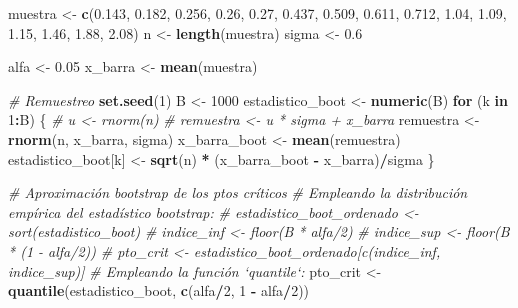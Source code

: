 \documentclass[
]{book}
\newenvironment{Shaded}{\begin{snugshade}}{\end{snugshade}}
\newcommand{\CommentTok}[1]{\textcolor[rgb]{0.56,0.35,0.01}{\textit{#1}}}
\newcommand{\ControlFlowTok}[1]{\textcolor[rgb]{0.13,0.29,0.53}{\textbf{#1}}}
\newcommand{\DecValTok}[1]{\textcolor[rgb]{0.00,0.00,0.81}{#1}}
\newcommand{\FloatTok}[1]{\textcolor[rgb]{0.00,0.00,0.81}{#1}}
\newcommand{\KeywordTok}[1]{\textcolor[rgb]{0.13,0.29,0.53}{\textbf{#1}}}
\newcommand{\NormalTok}[1]{#1}
\newcommand{\OperatorTok}[1]{\textcolor[rgb]{0.81,0.36,0.00}{\textbf{#1}}}
\newcommand{\StringTok}[1]{\textcolor[rgb]{0.31,0.60,0.02}{#1}}
\theoremstyle{definition}
\theoremstyle{definition}
\theoremstyle{definition}
\theoremstyle{remark}
\begin{document}
\begin{Shaded}
\begin{Highlighting}[]
\NormalTok{muestra <-}\StringTok{ }\KeywordTok{c}\NormalTok{(}\FloatTok{0.143}\NormalTok{, }\FloatTok{0.182}\NormalTok{, }\FloatTok{0.256}\NormalTok{, }\FloatTok{0.26}\NormalTok{, }\FloatTok{0.27}\NormalTok{, }\FloatTok{0.437}\NormalTok{, }\FloatTok{0.509}\NormalTok{, }
             \FloatTok{0.611}\NormalTok{, }\FloatTok{0.712}\NormalTok{, }\FloatTok{1.04}\NormalTok{, }\FloatTok{1.09}\NormalTok{, }\FloatTok{1.15}\NormalTok{, }\FloatTok{1.46}\NormalTok{, }\FloatTok{1.88}\NormalTok{, }\FloatTok{2.08}\NormalTok{)}
\NormalTok{n <-}\StringTok{ }\KeywordTok{length}\NormalTok{(muestra)}
\NormalTok{sigma <-}\StringTok{ }\FloatTok{0.6}

\NormalTok{alfa <-}\StringTok{ }\FloatTok{0.05}
\NormalTok{x_barra <-}\StringTok{ }\KeywordTok{mean}\NormalTok{(muestra)}

\CommentTok{# Remuestreo}
\KeywordTok{set.seed}\NormalTok{(}\DecValTok{1}\NormalTok{)}
\NormalTok{B <-}\StringTok{ }\DecValTok{1000}
\NormalTok{estadistico_boot <-}\StringTok{ }\KeywordTok{numeric}\NormalTok{(B)}
\ControlFlowTok{for}\NormalTok{ (k }\ControlFlowTok{in} \DecValTok{1}\OperatorTok{:}\NormalTok{B) \{}
    \CommentTok{# u <- rnorm(n)}
    \CommentTok{# remuestra <- u * sigma + x_barra}
\NormalTok{    remuestra <-}\StringTok{ }\KeywordTok{rnorm}\NormalTok{(n, x_barra, sigma)}
\NormalTok{    x_barra_boot <-}\StringTok{ }\KeywordTok{mean}\NormalTok{(remuestra)}
\NormalTok{    estadistico_boot[k] <-}\StringTok{ }\KeywordTok{sqrt}\NormalTok{(n) }\OperatorTok{*}\StringTok{ }\NormalTok{(x_barra_boot }\OperatorTok{-}\StringTok{ }\NormalTok{x_barra)}\OperatorTok{/}\NormalTok{sigma}
\NormalTok{\}}

\CommentTok{# Aproximación bootstrap de los ptos críticos}
\CommentTok{# Empleando la distribución empírica del estadístico bootstrap: }
    \CommentTok{# estadistico_boot_ordenado <- sort(estadistico_boot)}
    \CommentTok{# indice_inf <- floor(B * alfa/2)}
    \CommentTok{# indice_sup <- floor(B * (1 - alfa/2))}
    \CommentTok{# pto_crit <- estadistico_boot_ordenado[c(indice_inf, indice_sup)]}
\CommentTok{# Empleando la función `quantile`:}
\NormalTok{pto_crit <-}\StringTok{ }\KeywordTok{quantile}\NormalTok{(estadistico_boot, }\KeywordTok{c}\NormalTok{(alfa}\OperatorTok{/}\DecValTok{2}\NormalTok{, }\DecValTok{1} \OperatorTok{-}\StringTok{ }\NormalTok{alfa}\OperatorTok{/}\DecValTok{2}\NormalTok{))}


\end{Highlighting}
\end{Shaded}
\end{document}
